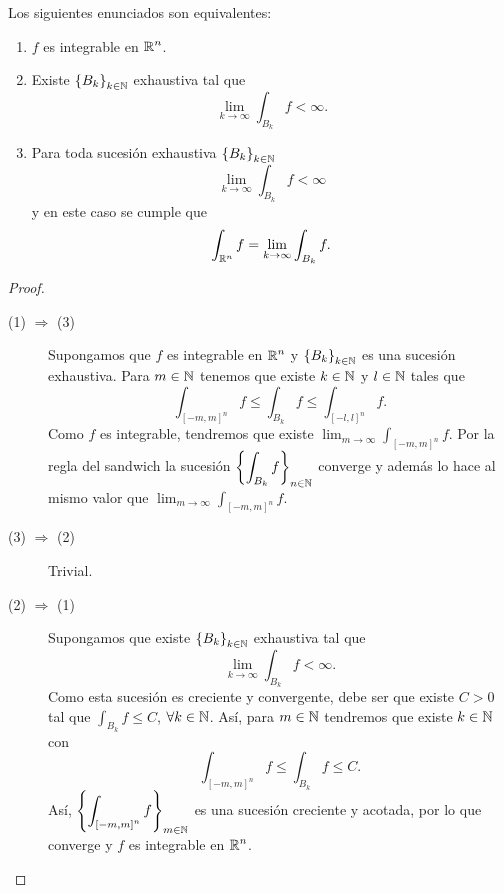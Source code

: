 \begin{prop}
Los siguientes enunciados son equivalentes:
\begin{enumerate}
\item $\displaystyle f $ es integrable en $\displaystyle \mathbb{R}^{n} $. 
\item Existe $\displaystyle \left\{ B_{k}\right\} _{k \in \mathbb{N}} $ exhaustiva tal que
	\[\lim_{k \to \infty}\int _{B_{k}}f <\infty .\]
\item Para toda sucesión exhaustiva $\displaystyle \left\{ B_{k}\right\} _{k \in \mathbb{N}} $ 
	\[\lim_{k \to \infty}\int _{B_{k}}f <\infty \]
	y en este caso se cumple que 
	\[\int _{\mathbb{R}^{n}}f = \lim_{k \to \infty}\int _{B_{k}}f  .\]
\end{enumerate}
\end{prop}
\begin{proof}
\begin{description}
	\item[(1) $\displaystyle \Rightarrow $ (3)] Supongamos que $\displaystyle f $ es integrable en $\displaystyle \mathbb{R}^{n} $ y $\displaystyle \left\{ B_{k}\right\} _{k \in \mathbb{N}} $ es una sucesión exhaustiva. Para $\displaystyle m \in \mathbb{N} $ tenemos que existe $\displaystyle k \in \mathbb{N} $ y $\displaystyle l \in \mathbb{N} $ tales que
		\[\int _{\left[-m,m\right]^{n} } f\leq\int _{B_{k}}f \leq \int _{\left[-l,  l\right]^{n} } f .\]
		Como $\displaystyle f $ es integrable, tendremos que existe $\displaystyle \lim_{m \to \infty}\int _{\left[-m,m\right] ^{n}}f  $. Por la regla del sandwich la sucesión $\displaystyle \left\{ \int _{B_{k}}f \right\} _{n\in\mathbb{N}} $ converge y además lo hace al mismo valor que $\displaystyle \lim_{m \to \infty}\int _{\left[-m,m\right] ^{n}}f $. 
\item[(3) $\displaystyle \Rightarrow $ (2)] Trivial.
\item[(2) $\displaystyle \Rightarrow $ (1)] Supongamos que existe $\displaystyle \left\{ B_{k}\right\} _{k \in \mathbb{N}} $ exhaustiva tal que 
	\[\lim_{k \to \infty}\int _{B_{k}}f <\infty .\]
	Como esta sucesión es creciente y convergente, debe ser que existe $\displaystyle C > 0 $ tal que $\displaystyle \int _{B_{k}}f \leq C $, $\displaystyle \forall k \in \mathbb{N} $. Así, para $\displaystyle m \in \mathbb{N} $ tendremos que existe $\displaystyle k \in \mathbb{N} $ con
	\[ \int _{\left[-m,m\right] ^{n}} f \leq \int _{B_{k}}f \leq C.\]
	Así, $\displaystyle \left\{ \int _{\left[-m,m\right] ^{n}}f \right\} _{m \in \mathbb{N}} $ es una sucesión creciente y acotada, por lo que converge y $\displaystyle f $ es integrable en $\displaystyle \mathbb{R}^{n} $. 	
\end{description}
\end{proof}
